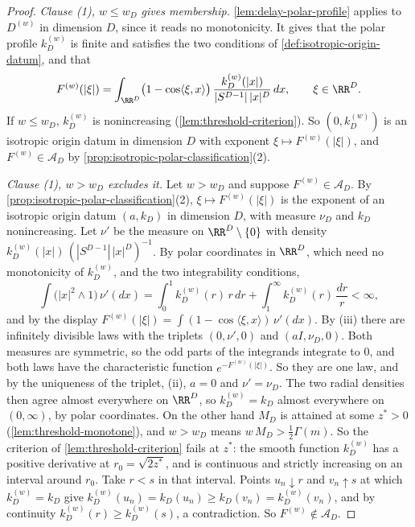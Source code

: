 \begin{proof}
\leanok
\emph{Clause (1), $w \le w_D$ gives membership.} \ref{lem:delay-polar-profile} applies to
$D^{(w)}$ in dimension $D$, since it reads no monotonicity. It gives that the polar profile
$k^{(w)}_D$ is finite and satisfies the two conditions of \ref{def:isotropic-origin-datum}, and
that
\[
  F^{(w)}(|\xi|) = \int_{\RR^D}\bigl(1 - \cos\langle\xi,x\rangle\bigr)\,
     \frac{k^{(w)}_D(|x|)}{|S^{D-1}|\,|x|^D}\,dx , \qquad \xi \in \RR^D .
\]
If $w \le w_D$, $k^{(w)}_D$ is nonincreasing (\ref{lem:threshold-criterion}). So
$(0,k^{(w)}_D)$ is an isotropic origin datum in dimension $D$ with exponent
$\xi \mapsto F^{(w)}(|\xi|)$, and $F^{(w)} \in \mathcal{A}_D$ by
\ref{prop:isotropic-polar-classification}(2).

\emph{Clause (1), $w > w_D$ excludes it.} Let $w > w_D$ and suppose
$F^{(w)} \in \mathcal{A}_D$. By \ref{prop:isotropic-polar-classification}(2),
$\xi \mapsto F^{(w)}(|\xi|)$ is the exponent of an isotropic origin datum $(a,k_D)$ in dimension
$D$, with \Levy{} measure $\nu_D$ and $k_D$ nonincreasing. Let $\nu'$ be the measure on
$\RR^D \setminus \{0\}$ with density $k^{(w)}_D(|x|)\,(|S^{D-1}|\,|x|^D)^{-1}$. By polar
coordinates in $\RR^D$, which need no monotonicity of $k^{(w)}_D$, and the two integrability
conditions,
\[
  \int\bigl(|x|^2 \wedge 1\bigr)\,\nu'(dx)
   = \int_0^1 k^{(w)}_D(r)\,r\,dr + \int_1^\infty k^{(w)}_D(r)\,\frac{dr}{r} < \infty ,
\]
and by the display $F^{(w)}(|\xi|) = \int(1 - \cos\langle\xi,x\rangle)\,\nu'(dx)$. By
(iii) there are
infinitely divisible laws with the triplets $(0,\nu',0)$ and $(aI,\nu_D,0)$. Both \Levy{}
measures are symmetric, so the odd parts of the integrands integrate to $0$, and both laws have
the characteristic function $e^{-F^{(w)}(|\xi|)}$. So they are one law, and by the uniqueness
of the triplet, (ii), $a = 0$ and $\nu' = \nu_D$. The two radial densities then agree
almost everywhere on $\RR^D$, so $k^{(w)}_D = k_D$ almost everywhere on $(0,\infty)$, by polar
coordinates. On the other hand $M_D$ is attained at some $z^* > 0$
(\ref{lem:threshold-monotone}), and $w > w_D$ means $w\,M_D > \tfrac12\Gamma(m)$. So the
criterion of \ref{lem:threshold-criterion} fails at $z^*$: the smooth function $k^{(w)}_D$ has a
positive derivative at $r_0 = \sqrt{2z^*}$, and is continuous and strictly increasing on an
interval around $r_0$. Take $r < s$ in that interval. Points $u_n \downarrow r$ and
$v_n \uparrow s$ at which $k^{(w)}_D = k_D$ give
$k^{(w)}_D(u_n) = k_D(u_n) \ge k_D(v_n) = k^{(w)}_D(v_n)$, and by continuity
$k^{(w)}_D(r) \ge k^{(w)}_D(s)$, a contradiction. So $F^{(w)} \notin \mathcal{A}_D$.


\end{proof}

